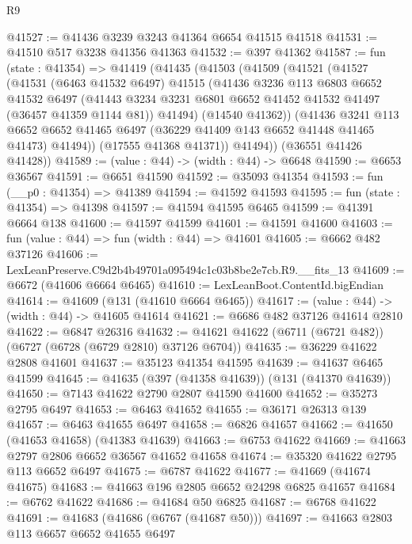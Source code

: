\begin{lexlean}{R9}
\begin{coremodule}
@41527 := @41436 @3239 @3243 @41364 @6654 @41515 @41518
@41531 := @41510 @517 @3238 @41356 @41363
@41532 := @397 @41362
@41587 := fun (state : @41354) =>
  @41419
    (@41435
      (@41503
        (@41509
          (@41521
            (@41527
              (@41531
                (@6463 @41532 @6497)
                @41515
                (@41436
                  @3236
                  @113
                  @6803
                  @6652
                  @41532
                  @6497
                  (@41443 @3234 @3231 @6801 @6652 @41452 @41532 @41497 (@36457 @41359 @1144 @81))
                  @41494)
                (@14540 @41362))
              (@41436
                @3241
                @113
                @6652
                @6652
                @41465
                @6497
                (@36229 @41409 @143 @6652 @41448 @41465 @41473)
                @41494))
            (@17555 @41368 @41371))
          @41494))
      (@36551 @41426 @41428))
@41589 := (value : @44) -> (width : @44) -> @6648
@41590 := @6653 @36567
@41591 := @6651 @41590
@41592 := @35093 @41354
@41593 := fun (__p0 : @41354) => @41389
@41594 := @41592 @41593
@41595 := fun (state : @41354) => @41398
@41597 := @41594 @41595 @6465
@41599 := @41391 @6664 @138
@41600 := @41597 @41599
@41601 := @41591 @41600
@41603 := fun (value : @44) => fun (width : @44) => @41601
@41605 := @6662 @482 @37126
@41606 := LexLeanPreserve.C9d2b4b49701a095494c1c03b8be2e7cb.R9.__fits_13
@41609 := @6672 (@41606 @6664 @6465)
@41610 := LexLeanBoot.ContentId.bigEndian
@41614 := @41609 (@131 (@41610 @6664 @6465))
@41617 := (value : @44) -> (width : @44) -> @41605 @41614
@41621 := @6686 @482 @37126 @41614 @2810
@41622 := @6847 @26316
@41632 := @41621 @41622 (@6711 (@6721 @482)) (@6727 (@6728 (@6729 @2810) @37126 @6704))
@41635 := @36229 @41622 @2808 @41601
@41637 := @35123 @41354 @41595
@41639 := @41637 @6465 @41599
@41645 := @41635 (@397 (@41358 @41639)) (@131 (@41370 @41639))
@41650 := @7143 @41622 @2790 @2807 @41590 @41600
@41652 := @35273 @2795 @6497
@41653 := @6463 @41652
@41655 := @36171 @26313 @139
@41657 := @6463 @41655 @6497
@41658 := @6826 @41657
@41662 := @41650 (@41653 @41658) (@41383 @41639)
@41663 := @6753 @41622
@41669 := @41663 @2797 @2806 @6652 @36567 @41652 @41658
@41674 := @35320 @41622 @2795 @113 @6652 @6497
@41675 := @6787 @41622
@41677 := @41669 (@41674 @41675)
@41683 := @41663 @196 @2805 @6652 @24298 @6825 @41657
@41684 := @6762 @41622
@41686 := @41684 @50 @6825
@41687 := @6768 @41622
@41691 := @41683 (@41686 (@6767 (@41687 @50)))
@41697 := @41663 @2803 @113 @6657 @6652 @41655 @6497

\end{coremodule}
\end{lexlean}
